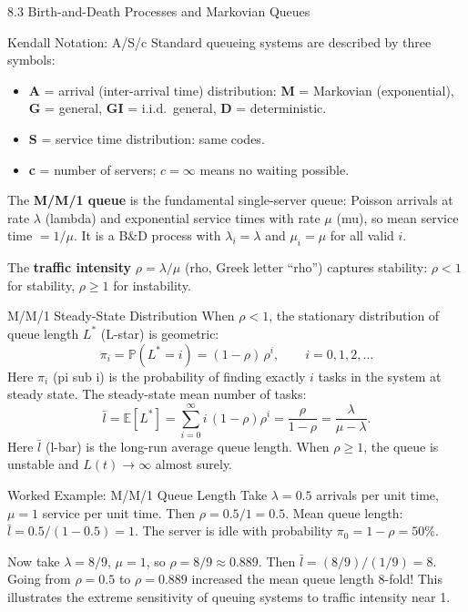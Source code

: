 \documentclass[aspectratio=169,10pt]{beamer}
\newcommand{\E}{\mathbb{E}}
\newcommand{\Prob}{\mathbb{P}}
\begin{document}
\begin{frame}[allowframebreaks]{8.3 Birth-and-Death Processes and Markovian Queues}
\begin{block}{Kendall Notation: A/S/c}
Standard queueing systems are described by three symbols:
\begin{itemize}
  \item \textbf{A} = arrival (inter-arrival time) distribution:
        \textbf{M} = Markovian (exponential), \textbf{G} = general,
        \textbf{GI} = i.i.d.\ general, \textbf{D} = deterministic.
  \item \textbf{S} = service time distribution: same codes.
  \item \textbf{c} = number of servers; $c = \infty$ means no waiting possible.
\end{itemize}
\end{block}

The \textbf{M/M/1 queue} is the fundamental single-server queue: Poisson
arrivals at rate $\lambda$ (lambda) and exponential service times with rate $\mu$
(mu), so mean service time $= 1/\mu$.  It is a B\&D process with $\lambda_i = \lambda$
and $\mu_i = \mu$ for all valid $i$.

The \textbf{traffic intensity} $\rho = \lambda/\mu$ (rho, Greek letter ``rho'')
captures stability: $\rho < 1$ for stability, $\rho \ge 1$ for instability.

\framebreak

\begin{block}{M/M/1 Steady-State Distribution}
When $\rho < 1$, the stationary distribution of queue length $L^*$ (L-star) is
geometric:
\[
  \pi_i = \Prob(L^* = i) = (1-\rho)\,\rho^i, \qquad i = 0, 1, 2, \ldots
\]
Here $\pi_i$ (pi sub i) is the probability of finding exactly $i$ tasks in the
system at steady state.  The steady-state mean number of tasks:
\[
  \bar{l} = \E[L^*] = \sum_{i=0}^\infty i\,(1-\rho)\rho^i = \frac{\rho}{1-\rho}
          = \frac{\lambda}{\mu-\lambda}.
\]
Here $\bar{l}$ (l-bar) is the long-run average queue length.
When $\rho \ge 1$, the queue is unstable and $L(t) \to \infty$ almost surely.
\end{block}

\begin{exampleblock}{Worked Example: M/M/1 Queue Length}
Take $\lambda = 0.5$ arrivals per unit time, $\mu = 1$ service per unit time.
Then $\rho = 0.5/1 = 0.5$.  Mean queue length: $\bar{l} = 0.5/(1-0.5) = 1$.
The server is idle with probability $\pi_0 = 1 - \rho = 50\%$.

Now take $\lambda = 8/9$, $\mu = 1$, so $\rho = 8/9 \approx 0.889$.  Then
$\bar{l} = (8/9)/(1/9) = 8$.  Going from $\rho = 0.5$ to $\rho = 0.889$
increased the mean queue length 8-fold!  This illustrates the extreme sensitivity
of queuing systems to traffic intensity near 1.
\end{exampleblock}


\end{frame}
\end{document}
